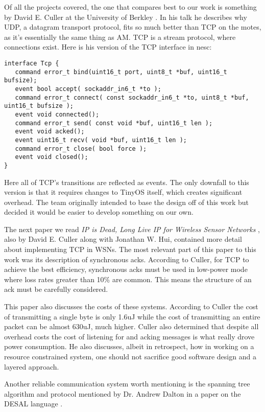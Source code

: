 \documentclass{sig-alternate}
\begin{document}
Of all the projects covered, the one that compares best to our work is something by David E. Culler at the University of Berkley \cite{david}. In his talk he describes why UDP, a datagram transport protocol, fits so much better than TCP on the motes, as it's essentially the same thing as AM. TCP is a stream protocol, where connections exist. Here is his version of the TCP interface in nesc:
\lstset{language=nesc,caption=TCP Interface,label=TCP}
\begin{lstlisting}
interface Tcp {
   command error_t bind(uint16_t port, uint8_t *buf, uint16_t bufsize);
   event bool accept( sockaddr_in6_t *to );
   command error_t connect( const sockaddr_in6_t *to, uint8_t *buf, uint16_t bufsize );
   event void connected();
   command error_t send( const void *buf, uint16_t len );
   event void acked();
   event uint16_t recv( void *buf, uint16_t len );
   command error_t close( bool force );
   event void closed();
}
\end{lstlisting}
Here all of TCP's transitions are reflected as events. The only downfall to this version is that it requires changes to TinyOS itself, which creates significant overhead. The team originally intended to base the design off of this work but decided it would be easier to develop something on our own.

The next paper we read \emph{IP is Dead, Long Live IP for Wireless Sensor Networks} \cite{Hui:2008:IDL:1460412.1460415}, also by David E. Culler along with Jonathan W. Hui, contained more detail about implementing TCP in WSNs. The most relevant part of this paper to this work was its description of synchronous acks. According to Culler, for TCP to achieve the best efficiency, synchronous acks must be used in low-power mode where loss rates greater than 10\% are common. This means the structure of an ack must be carefully considered.

This paper also discusses the costs of these systems. According to Culler the cost of transmitting a single byte is only 1.6uJ while the cost of transmitting an entire packet can be almost 630uJ, much higher. Culler also determined that despite all overhead costs the cost of listening for and acking messages is what really drove power consumption. He also discusses, albeit in retrospect, how in working on a resource constrained system, one should not sacrifice good software design and a layered approach.

Another reliable communication system worth mentioning is the spanning tree algorithm and protocol mentioned by Dr. Andrew Dalton in a paper on the DESAL language \cite{DBLP}.
\end{document}

